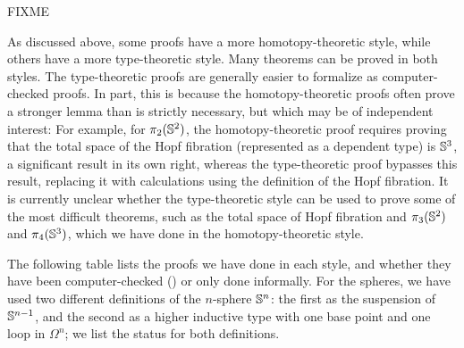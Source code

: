 \begin{thm}
FIXME
\end{thm}


As discussed above, some proofs have a more homotopy-theoretic style,
while others have a more type-theoretic style.  Many theorems can be
proved in both styles.  The type-theoretic proofs are generally easier
to formalize as computer-checked proofs.  In part, this is because the
homotopy-theoretic proofs often prove a stronger lemma than is strictly
necessary, but which may be of independent interest: For example, for
$\pi_2(\mathbb{S} ^2)$, the homotopy-theoretic proof requires proving that the
total space of the Hopf fibration (represented as a dependent type) is
$\mathbb{S} ^3$, a significant result in its own right, whereas the
type-theoretic proof bypasses this result, replacing it with
calculations using the definition of the Hopf fibration.  It is
currently unclear whether the type-theoretic style can be used to prove
some of the most difficult theorems, such as the total space of Hopf
fibration and $\pi_3(\mathbb{S} ^2)$ and $\pi_4(\mathbb{S} ^3)$, which we have done in
the homotopy-theoretic style.

The following table lists the proofs we have done in each style, and
whether they have been computer-checked (\checkmark) or only done
informally.  For the spheres, we have used two different definitions of
the $n$-sphere $\mathbb{S} ^n$: the first as the suspension of $\mathbb{S} ^ {n-1}$,
and the second as a higher inductive type with one base point and one
loop in $\Omega^n$; we list the status for both definitions.

